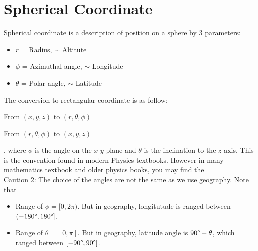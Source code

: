 \documentclass[class=article, crop=false, 12pt]{standalone}
\begin{document}
\linesep
\section{Spherical Coordinate}

Spherical coordinate is a description of position on a sphere by 3 parameters:
\begin{itemize}
    \item $r$ = Radius, $\sim$ Altitute
    \item $\phi$ = Azimuthal angle, $\sim$ Longitude
    \item $\theta$ = Polar angle, $\sim$ Latitude
\end{itemize}

The conversion to rectangular coordinate is as follow:

From $(x,y,z)$ to $(r,\theta,\phi)$

From $(r,\theta, \phi)$ to $(x,y,z)$


, 
where $\phi$ is the angle on the $x$-$y$ plane and $\theta$ is the inclination to the $z$-axis.
This is the convention found in modern Physics textbooks. 
However in many mathematics textbook and older physics books, 
you may find the \\

\ul{Caution 2:} The choice of the angles are not the same as we use geography. Note that
\begin{itemize}
    \item Range of $\phi = [0, 2\pi)$. But in geography, longitutude is ranged between $(-180\degree, 180\degree]$.
    \item Range of $\theta = [0,\pi]$. But in geography, latitude angle is $90\degree-\theta$, which ranged between $[-90\degree, 90\degree]$.
\end{itemize}
\end{document}
